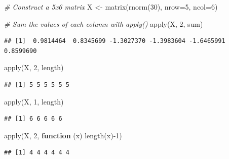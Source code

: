 \documentclass[
]{book}
\newenvironment{Shaded}{\begin{snugshade}}{\end{snugshade}}
\newcommand{\AttributeTok}[1]{\textcolor[rgb]{0.77,0.63,0.00}{#1}}
\newcommand{\CommentTok}[1]{\textcolor[rgb]{0.56,0.35,0.01}{\textit{#1}}}
\newcommand{\ControlFlowTok}[1]{\textcolor[rgb]{0.13,0.29,0.53}{\textbf{#1}}}
\newcommand{\DecValTok}[1]{\textcolor[rgb]{0.00,0.00,0.81}{#1}}
\newcommand{\FunctionTok}[1]{\textcolor[rgb]{0.00,0.00,0.00}{#1}}
\newcommand{\NormalTok}[1]{#1}
\newcommand{\OtherTok}[1]{\textcolor[rgb]{0.56,0.35,0.01}{#1}}
\newcommand{\SpecialCharTok}[1]{\textcolor[rgb]{0.00,0.00,0.00}{#1}}
\begin{document}
\begin{Shaded}
\begin{Highlighting}[]
\CommentTok{\# Construct a 5x6 matrix}
\NormalTok{X }\OtherTok{\textless{}{-}} \FunctionTok{matrix}\NormalTok{(}\FunctionTok{rnorm}\NormalTok{(}\DecValTok{30}\NormalTok{), }\AttributeTok{nrow=}\DecValTok{5}\NormalTok{, }\AttributeTok{ncol=}\DecValTok{6}\NormalTok{)}

\CommentTok{\# Sum the values of each column with \textasciigrave{}apply()\textasciigrave{}}
\FunctionTok{apply}\NormalTok{(X, }\DecValTok{2}\NormalTok{, sum)}
\end{Highlighting}
\end{Shaded}

\begin{verbatim}
## [1]  0.9814464  0.8345699 -1.3027370 -1.3983604 -1.6465991  0.8599690
\end{verbatim}

\begin{Shaded}
\begin{Highlighting}[]
\FunctionTok{apply}\NormalTok{(X, }\DecValTok{2}\NormalTok{, length)}
\end{Highlighting}
\end{Shaded}

\begin{verbatim}
## [1] 5 5 5 5 5 5
\end{verbatim}

\begin{Shaded}
\begin{Highlighting}[]
\FunctionTok{apply}\NormalTok{(X, }\DecValTok{1}\NormalTok{, length)}
\end{Highlighting}
\end{Shaded}

\begin{verbatim}
## [1] 6 6 6 6 6
\end{verbatim}

\begin{Shaded}
\begin{Highlighting}[]
\FunctionTok{apply}\NormalTok{(X, }\DecValTok{2}\NormalTok{, }\ControlFlowTok{function}\NormalTok{ (x) }\FunctionTok{length}\NormalTok{(x)}\SpecialCharTok{{-}}\DecValTok{1}\NormalTok{)}
\end{Highlighting}
\end{Shaded}

\begin{verbatim}
## [1] 4 4 4 4 4 4
\end{verbatim}
\end{document}
